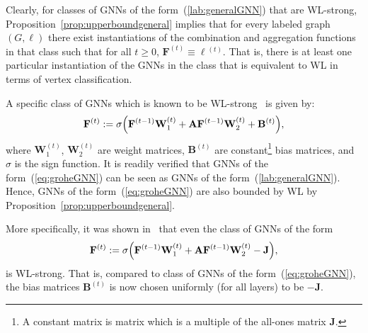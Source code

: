 Clearly, for classes of GNNs of the form~(\ref{lab:generalGNN}) that are WL-strong, 
Proposition~\ref{prop:upperboundgeneral} implies that for every labeled graph $(G,\pmb{\ell})$ there
exist instantiations of the combination and aggregation functions in that class such that
for all $t\geq 0$, $\mathbf{F}^{(t)}\equiv \pmb{\ell}{}^{(t)}$. That is, there is at least one particular instantiation of the GNNs in the class that is equivalent to WL in terms of vertex classification.

A specific class of GNNs which is known to be WL-strong~\cite{grohewl} is given by:
\begin{equation}
\mathbf{F}^{(t)}:=\sigma\Bigl(\mathbf{F}^{(t-1)}\mathbf{W}_1^{(t)}+ \mathbf{A}\mathbf{F}^{(t-1)}\mathbf{W}_2^{(t)} + \mathbf{B}^{(t)}\Bigr), \label{eq:groheGNN}
\end{equation}
where $\mathbf{W}_1^{(t)}$, $\mathbf{W}_2^{(t)}$  are weight matrices, $\mathbf{B}^{(t)}$ are 
constant\footnote{A constant matrix is matrix which is a multiple of the all-ones matrix $\mathbf{J}$.} bias matrices, and $\sigma$ is the sign function. It is readily verified that GNNs of the form~(\ref{eq:groheGNN}) can be seen as  GNNs of the form~(\ref{lab:generalGNN}). Hence, GNNs of the form~(\ref{eq:groheGNN}) are also bounded by WL by Proposition~\ref{prop:upperboundgeneral}.

More specifically, it was shown in~\cite{grohewl} that even the class of GNNs of the form
\begin{equation}
\mathbf{F}^{(t)}:=\sigma\Bigl(\mathbf{F}^{(t-1)}\mathbf{W}_1^{(t)}+ \mathbf{A}\mathbf{F}^{(t-1)}\mathbf{W}_2^{(t)} - \mathbf{J}\Bigr), \label{eq:groheGNNwithJ}
\end{equation}
is WL-strong. That is, compared to class of GNNs of the form~(\ref{eq:groheGNN}), the bias matrices $\mathbf{B}^{(t)}$ is now chosen uniformly (for all layers) to be $-\mathbf{J}$.


